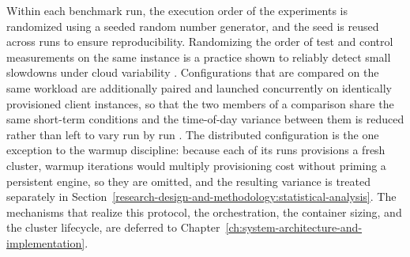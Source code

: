 Within each benchmark run, the execution order of the experiments is randomized using a seeded random number generator, and the seed is reused across runs to ensure reproducibility. Randomizing the order of test and control measurements on the same instance is a practice shown to reliably detect small slowdowns under cloud variability \parencite{laaber2019_software_microbenchmarking_cloud}. Configurations that are compared on the same workload are additionally paired and launched concurrently on identically provisioned client instances, so that the two members of a comparison share the same short-term conditions and the time-of-day variance between them is reduced rather than left to vary run by run \parencite{laaber2019_software_microbenchmarking_cloud}. The distributed configuration is the one exception to the warmup discipline: because each of its runs provisions a fresh cluster, warmup iterations would multiply provisioning cost without priming a persistent engine, so they are omitted, and the resulting variance is treated separately in Section~\ref{research-design-and-methodology:statistical-analysis}. The mechanisms that realize this protocol, the orchestration, the container sizing, and the cluster lifecycle, are deferred to Chapter~\ref{ch:system-architecture-and-implementation}.